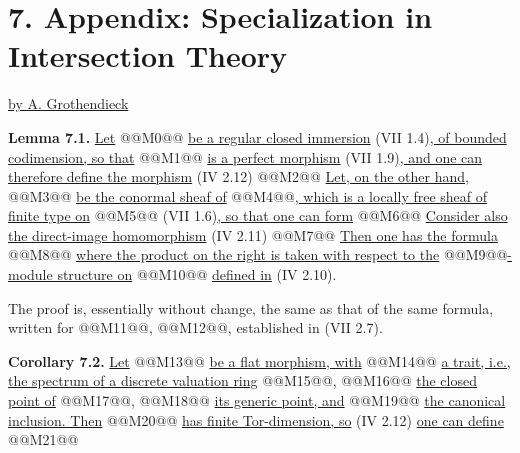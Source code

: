 
\section*{7. Appendix: Specialization in Intersection Theory}
\begin{center}
\underline{by A. Grothendieck}
\end{center}

\textbf{Lemma 7.1.} \uline{Let} @@M0@@ \uline{be a regular closed immersion} (VII 1.4)\uline{, of bounded codimension, so that} @@M1@@ \uline{is a perfect morphism} (VII 1.9)\uline{, and one can therefore define the morphism} (IV 2.12)
@@M2@@
\uline{Let, on the other hand,} @@M3@@ \uline{be the conormal sheaf of} @@M4@@\uline{, which is a locally free sheaf of finite type on} @@M5@@ (VII 1.6)\uline{, so that one can form}
@@M6@@
\uline{Consider also the direct-image homomorphism} (IV 2.11)
@@M7@@
\uline{Then one has the formula}
@@M8@@
\uline{where the product on the right is taken with respect to the} @@M9@@\uline{-module structure on} @@M10@@ \uline{defined in} (IV 2.10).

The proof is, essentially without change, the same as that of the same formula, written for @@M11@@, @@M12@@, established in (VII 2.7).

\textbf{Corollary 7.2.} \uline{Let} @@M13@@ \uline{be a flat morphism, with} @@M14@@ \uline{a trait, i.e., the spectrum of a discrete valuation ring} @@M15@@, @@M16@@ \uline{the closed point of} @@M17@@, @@M18@@ \uline{its generic point, and} @@M19@@ \uline{the canonical inclusion. Then} @@M20@@ \uline{has finite Tor-dimension, so} (IV 2.12) \uline{one can define}
@@M21@@
